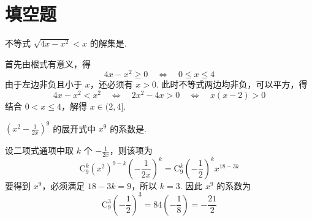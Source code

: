\section{填空题}
\begin{problem}
不等式 \(\sqrt{4x-x^2}<x\) 的解集是\fillinblank{}.
\answer{\((2,4]\)}

\begin{solution}
首先由根式有意义，得
\[
4x-x^2\geqslant0\quad\Longleftrightarrow\quad 0\leqslant x\leqslant4
\]
由于左边非负且小于 \(x\)，还必须有 \(x>0\). 此时不等式两边均非负，可以平方，得
\[
4x-x^2<x^2
\quad\Longleftrightarrow\quad
2x^2-4x>0
\quad\Longleftrightarrow\quad
x(x-2)>0
\]
结合 \(0<x\leqslant4\)，解得 \(x\in(2,4]\).
\end{solution}
\end{problem}

\begin{problem}
\(\left(x^2-\frac{1}{2x}\right)^9\) 的展开式中 \(x^9\) 的系数是\fillinblank{}.

\begin{solution}
设二项式通项中取 \(k\) 个 \(-\frac{1}{2x}\)，则该项为
\[
\mathrm C_9^k(x^2)^{9-k}\left(-\frac{1}{2x}\right)^k
=\mathrm C_9^k\left(-\frac12\right)^k x^{18-3k}
\]
要得到 \(x^9\)，必须满足 \(18-3k=9\)，所以 \(k=3\). 因此 \(x^9\) 的系数为
\[
\mathrm C_9^3\left(-\frac12\right)^3
=84\left(-\frac18\right)=-\frac{21}{2}
\]
\end{solution}
\end{problem}

